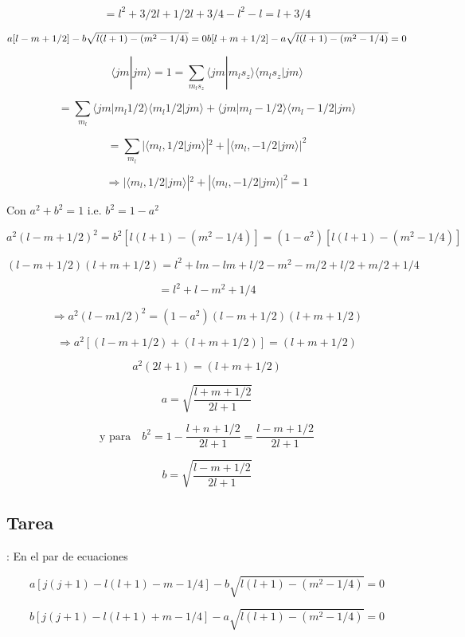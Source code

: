 \documentclass{report}
\begin{document}
\[=l^2 + 3/2 l + 1/2 l +3/4 - l^2 -l = l+3/4\]

\begin{equation}
a[l-m+1/2]-b \sqrt{l(l+1)-(m^2-1/4)}=0\\
b[l+m+1/2]-a \sqrt{l(l+1)-(m^2-1/4)} = 0\\
\end{equation}

\[\langle jm|jm \rangle = 1 = \sum_{m_{l}s_{z}} \langle j m | m_{l}s_{z}\rangle \langle m_{l}s_{z}|jm\rangle\]

\[= \sum_{m_{l}} \langle jm| m_{l}1/2\rangle \langle m_l 1/2 |jm \rangle + \langle jm | m_l -1/2 \rangle\langle m_l -1/2 |jm \rangle \]

\[= \sum _{m_{l} } |\langle m_l , 1/2 | jm \rangle|^2 + |\langle m_l , -1/2 |jm\rangle|^2 \]

\[\Rightarrow |\langle m_l , 1/2 | jm \rangle|^2 + |\langle m_l , -1/2 |jm\rangle|^2 = 1\]

Con $a^2 + b^2 = 1 $ i.e. $b^2 = 1-a^2$

\[a^2 (l - m+1/2)^2 = b^2 [l(l+1)-(m^2 - 1/4)] = (1-a^2)[l(l+1)-(m^2 - 1/4)]\]

\[(l-m+1/2)(l+m+1/2) = l^2 + lm -lm + l/2 - m^2 -m/2 + l/2 + m/2 + 1/4\]

\[= l^2 + l - m^2 + 1/4\]

\[\Rightarrow a^2 (l-m 1/2 )^2 = (1-a^2)(l-m+1/2)(l+m+1/2)\]

\[\Rightarrow a^2[ (l-m +1/2 ) + (l+m+1/2)] = (l+m+1/2)\]

\[a^2 (2l + 1) = (l+m +1/2)\]

\begin{equation}
a = \sqrt{\frac{l+m+1/2}{2l+1}} 
\end{equation}

\[ \text{y para} \quad b^2 = 1- \frac{l+n+1/2}{2l+1} = \frac{l-m + 1/2}{2l+1}\]

\begin{equation}
b = \sqrt{\frac{l-m+1/2}{2l+1}}
\end{equation}

\subsection{Tarea}: En el par de ecuaciones

\[a[j(j+1) - l(l+1)-m-1/4]-b \sqrt{l(l+1)-(m^2 -1/4)} = 0\]

\begin{equation}
b[j(j+1) - l(l+1)+m-1/4]-a \sqrt{l(l+1)-(m^2 -1/4)} = 0
\end{equation}
\end{document}
